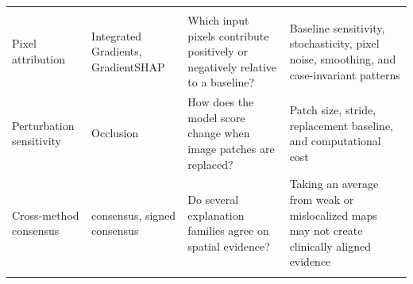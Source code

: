 \begin{longtable}[]{@{}llll@{}}
\begin{minipage}[t]{0.22\columnwidth}
		\strut
	\end{minipage}\tabularnewline
	\begin{minipage}[t]{0.22\columnwidth}\raggedright
		Pixel attribution\strut
	\end{minipage} & \begin{minipage}[t]{0.22\columnwidth}\raggedright
		Integrated Gradients, GradientSHAP\strut
	\end{minipage} & \begin{minipage}[t]{0.22\columnwidth}\raggedright
		Which input pixels contribute positively or negatively relative to a
		baseline?\strut
	\end{minipage} & \begin{minipage}[t]{0.22\columnwidth}\raggedright
		Baseline sensitivity, stochasticity, pixel noise, smoothing, and
		case-invariant patterns\strut
	\end{minipage}\tabularnewline
	\begin{minipage}[t]{0.22\columnwidth}\raggedright
		Perturbation sensitivity\strut
	\end{minipage} & \begin{minipage}[t]{0.22\columnwidth}\raggedright
		Occlusion\strut
	\end{minipage} & \begin{minipage}[t]{0.22\columnwidth}\raggedright
		How does the model score change when image patches are replaced?\strut
	\end{minipage} & \begin{minipage}[t]{0.22\columnwidth}\raggedright
		Patch size, stride, replacement baseline, and computational cost\strut
	\end{minipage}\tabularnewline
	\begin{minipage}[t]{0.22\columnwidth}\raggedright
		Cross-method consensus\strut
	\end{minipage} & \begin{minipage}[t]{0.22\columnwidth}\raggedright
		consensus, signed consensus\strut
	\end{minipage} & \begin{minipage}[t]{0.22\columnwidth}\raggedright
		Do several explanation families agree on spatial evidence?\strut
	\end{minipage} & \begin{minipage}[t]{0.22\columnwidth}\raggedright
		Taking an average from weak or mislocalized maps may not create 
		clinically aligned evidence\strut
	\end{minipage}\tabularnewline
	\begin{minipage}[t]{0.22\columnwidth}\raggedright

\end{minipage}
\end{longtable}
